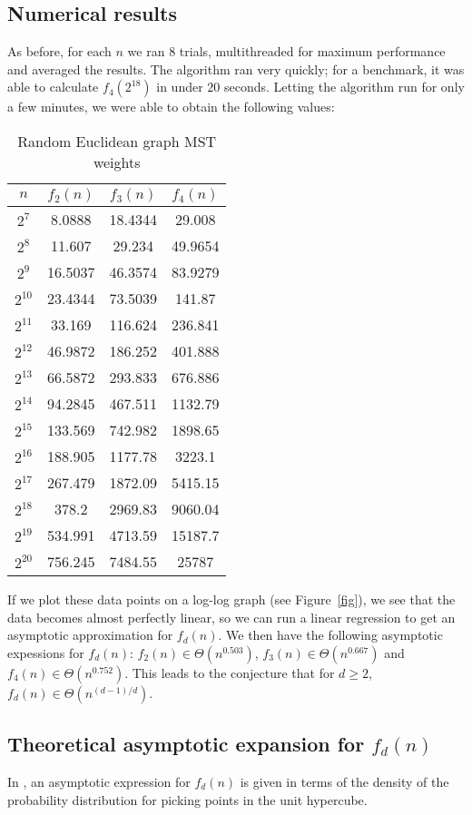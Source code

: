 \documentclass[a4paper, 10pt, twocolumn, twoside]{article}
\begin{document}
\subsection{Numerical results}
As before, for each $n$ we ran $8$ trials, multithreaded for maximum performance and averaged the results. The algorithm ran very quickly; for a benchmark, it was able to calculate $f_4(2^{18})$ in under $20$ seconds. Letting the algorithm run for only a few minutes, we were able to obtain the following values:

\renewcommand{\arraystretch}{1.5}
\begin{table}[htbp]
\centering
\caption{Random Euclidean graph MST weights}
\begin{tabular}{||c|c|c|c||}
\hline
$n$ & $f_2(n)$ & $f_3(n)$ & $f_4(n)$ \\
\hline
$2^{7}$& 8.0888&	18.4344&	29.008\\
$2^{8}$&11.607& 29.234& 49.9654\\
$2^{9}$&16.5037&	46.3574&	83.9279\\
$2^{10}$&23.4344&	73.5039&	141.87\\
$2^{11}$&33.169& 116.624& 236.841\\
$2^{12}$&46.9872&	186.252&	401.888\\
$2^{13}$&66.5872&	293.833&	676.886\\
$2^{14}$&94.2845&	467.511&	1132.79\\
$2^{15}$&133.569& 742.982&	1898.65\\
$2^{16}$&188.905&	1177.78&	3223.1\\
$2^{17}$&267.479&	1872.09&	5415.15\\
$2^{18}$&378.2& 2969.83& 9060.04\\
$2^{19}$&534.991&	4713.59&	15187.7\\
$2^{20}$&756.245&	7484.55&	25787\\
\hline
\end{tabular}
\end{table}

If we plot these data points on a log-log graph (see Figure~\ref{fig}), we see that the data becomes almost perfectly linear, so we can run a linear regression to get an asymptotic approximation for $f_d(n)$. We then have the following asymptotic expessions for $f_d(n)$: $f_2(n)\in\Theta(n^{0.503})$, $f_3(n)\in \Theta(n^{0.667})$ and $f_4(n)\in \Theta(n^{0.752})$. This leads to the conjecture that for $d\geq 2$, $f_d(n)\in \Theta(n^{(d-1)/d})$. 

\subsection{Theoretical asymptotic expansion for $f_d(n)$}
In \cite{St1988}, an asymptotic expression for $f_d(n)$ is given in terms of the density of the probability distribution for picking points in the unit hypercube.
\end{document}
